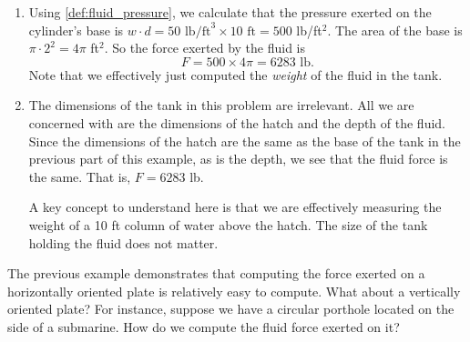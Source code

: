 \begin{example}
\begin{enumerate}
{}
%
\end{enumerate}%
\vspace{0pt}
\solution
%
\begin{enumerate}
	\item	Using \autoref{def:fluid_pressure}, we calculate that the pressure exerted on the cylinder's base is $w\cdot d = 50 \text{ lb/ft}^3\times 10\text{ ft} = 500$ lb/ft$^2$. The area of the base is $\pi\cdot 2^2 = 4\pi$ ft$^2$. So the force exerted by the fluid is 
	\[F = 500\times 4\pi = 6283\text{ lb}.\]
Note that we effectively just computed the \emph{weight} of the fluid in the tank.

	\item	The dimensions of the tank in this problem are irrelevant. All we are concerned with are the dimensions of the hatch and the depth of the fluid. Since the dimensions of the hatch are the same as the base of the tank in the previous part of this example, as is the depth, we see that the fluid force is the same. That is, $F = 6283$ lb. 
	
	A key concept to understand here is that we are effectively measuring the weight of a 10 ft column of water above the hatch. The size of the tank holding the fluid does not matter.
\end{enumerate}
\end{example}

The previous example demonstrates that computing the force exerted on a horizontally oriented plate is relatively easy to compute. What about a vertically oriented plate? For instance, suppose we have a circular porthole located on the side of a submarine. How do we compute the fluid force exerted on it?

